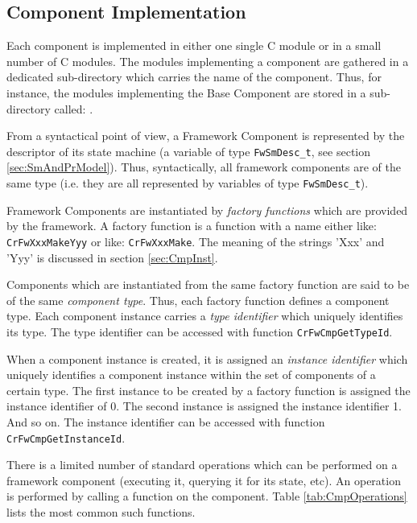 \documentclass{pnp_article}
\begin{document}
\subsection{Component Implementation}\label{sec:CmpImpl} 

Each component is implemented in either one single C module or in a small number of C modules. The modules implementing a component are gathered in a dedicated sub-directory which carries the name of the component. Thus, for instance, the modules implementing the Base Component are stored in a sub-directory called: .

From a syntactical point of view, a Framework Component is represented by the descriptor of its state machine (a variable of type \texttt{FwSmDesc\_t}, see section \ref{sec:SmAndPrModel}). Thus, syntactically, all framework components are of the same type (i.e. they are all represented by variables of type \texttt{FwSmDesc\_t}). 

Framework Components are instantiated by \textit{factory functions} which are provided by the framework. A factory function is a function with a name either like: \texttt{CrFwXxxMakeYyy} or like: \texttt{CrFwXxxMake}. The meaning of the strings 'Xxx' and 'Yyy' is discussed in section  \ref{sec:CmpInst}.

Components which are instantiated from the same factory function are said to be of the same \textit{component type}. Thus, each factory function defines a component type. Each component instance carries a \textit{type identifier} which uniquely identifies its type. The type identifier can be accessed with function \texttt{CrFwCmpGetTypeId}.

When a component instance is created, it is assigned an \textit{instance identifier} which uniquely identifies a component instance within the set of components of a certain type. The first instance to be created by a factory function is assigned the instance identifier of 0. The second instance is assigned the instance identifier 1. And so on. The instance identifier can be accessed with function \texttt{CrFwCmpGetInstanceId}.

There is a limited number of standard operations which can be performed on a framework component (executing it, querying it for its state, etc). An operation is performed by calling a function on the component. Table \ref{tab:CmpOperations} lists the most common such functions. 
\end{document}
